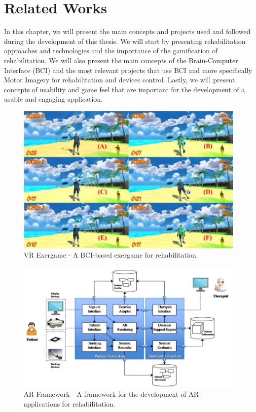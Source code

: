 \chapter{Related Works}\label{ch:related_works}
In this chapter, we will present the main concepts and projects used and followed during the development of this thesis. 
We will start by presenting rehabilitation approaches and technologies and the importance of the gamification of rehabilitation. 
We will also present the main concepts of the Brain-Computer Interface (BCI) and the most relevant projects that use BCI and more specifically Motor Imagery for rehabilitation and devices control.
Lastly, we will present concepts of usability and game feel that are important for the development of a usable and engaging application.

\begin{figure}[htbp!]
    \centering
    \includegraphics[width=\textwidth]{Figures/Related/ave_exergame}
    \caption{VR Exergame - A BCI-based exergame for rehabilitation.}
\end{figure}

\begin{figure}[htbp!]
    \centering
    \includegraphics[width=\textwidth]{Figures/Related/ar_app_framework}
    \caption{AR Framework - A framework for the development of AR applications for rehabilitation.}
\end{figure}


